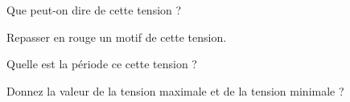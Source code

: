 \documentclass[a4paper,11pt]{exam}
\begin{document}
\begin{questions}
	\question Que peut-on dire de cette tension ?
	\fillwithdottedlines{1.5cm}
	
	\question Repasser en rouge un motif de cette tension.
	
	\question Quelle est la période ce cette tension ?
	\fillwithdottedlines{2cm}
	
	\question Donnez la valeur de la tension maximale et de la tension minimale ?
	\fillwithdottedlines{2cm}
\end{questions}
\ \label{LastPage}
\end{document}
